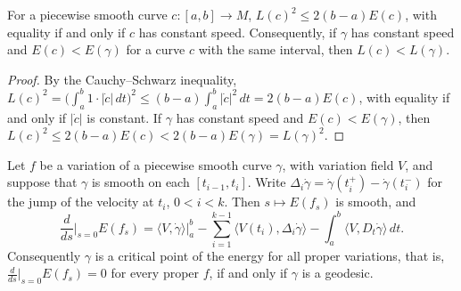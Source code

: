 \begin{lemma}\label{riemannian-geometry:lemma-energy-length}
For a piecewise smooth curve $c \colon [a, b] \to M$, $L(c)^2 \leq 2(b - a)E(c)$, with equality if and only if $c$ has constant speed. Consequently, if $\gamma$ has constant
speed and $E(c) < E(\gamma)$ for a curve $c$ with the same interval, then $L(c) < L(\gamma)$.
\end{lemma}

\begin{proof}
By the Cauchy--Schwarz inequality, $L(c)^2 = \bigl(\int_a^b1 \cdot |\dot c|\,dt\bigr)^2 \leq (b - a)\int_a^b|\dot c|^2\,dt = 2(b - a)E(c)$, with equality if and only if $|\dot c|$ is
constant. If $\gamma$ has constant speed and $E(c) < E(\gamma)$, then $L(c)^2 \leq 2(b - a)E(c) < 2(b - a)E(\gamma) = L(\gamma)^2$.
\end{proof}

\begin{proposition}\label{riemannian-geometry:proposition-first-variation}
Let $f$ be a variation of a piecewise smooth curve $\gamma$, with variation field $V$, and suppose that $\gamma$ is smooth on each $[t_{i-1}, t_i]$. Write
$\Delta_i\dot\gamma = \dot\gamma(t_i^+) - \dot\gamma(t_i^-)$ for the jump of the velocity at $t_i$, $0 < i < k$. Then $s \mapsto E(f_s)$ is smooth, and
\[
\frac{d}{ds}\Big|_{s=0}E(f_s) = \langle V, \dot\gamma\rangle\Big|_a^b - \sum_{i=1}^{k-1}\langle V(t_i), \Delta_i\dot\gamma\rangle - \int_a^b\langle V, D_t\dot\gamma\rangle\,dt .
\]
Consequently $\gamma$ is a critical point of the energy for all proper variations, that is, $\frac{d}{ds}|_{s=0}E(f_s) = 0$ for every proper $f$, if and only if $\gamma$ is a
geodesic.
\end{proposition}

